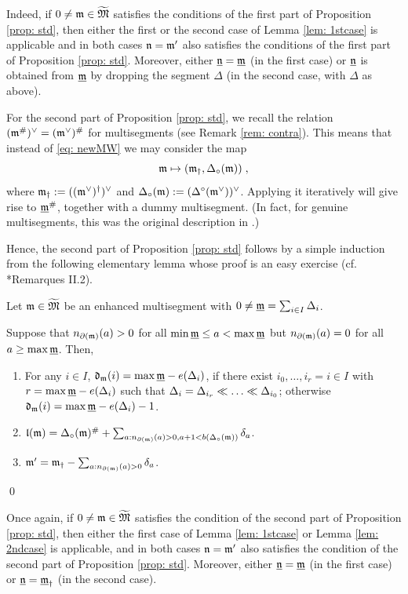 \documentclass{ert-l} %
\begin{document}
Indeed, if $0\ne\mathfrak{m} \in \widetilde{\mathfrak{M}}$ satisfies the conditions of the first part of
Proposition \ref{prop: std}, then either the first or the second case of Lemma \ref{lem: 1stcase} is applicable and
in both cases $\mathfrak{n} = \mathfrak{m}'$ also satisfies the conditions of the first part of Proposition \ref{prop: std}. Moreover, either $\underline{\mathfrak{n}}=\underline{\mathfrak{m}}$
(in the first case) or $\underline{\mathfrak{n}}$ is obtained from $\underline{\mathfrak{m}}$ by dropping the segment $\Delta$ (in the second case,
with $\Delta$ as above).


For the second part of Proposition \ref{prop: std}, we recall the relation $(\mathfrak{m}^\#)^\vee=(\mathfrak{m}^\vee)^\#$ for multisegments (see Remark \ref{rem: contra}).
This means that instead of \eqref{eq: newMW} we may consider the map
\[
\mathfrak{m}\mapsto(\mathfrak{m}_{\dagger}, \Delta_{\circ}(\mathfrak{m}))\;,
\]
where $\mathfrak{m}_{\dagger}: = ((\mathfrak{m}^\vee)^{\dagger})^\vee$ and $\Delta_{\circ}(\mathfrak{m}): =(\Delta^{\circ}(\mathfrak{m}^\vee))^\vee$.
Applying it iteratively will give rise to $\underline{\mathfrak{m}}^\#$, together with a dummy multisegment.
(In fact, for genuine multisegments, this was the original description in \cite{MR863522}.)

Hence, the second part of Proposition \ref{prop: std} follows by a simple induction from the following
elementary lemma whose proof is an easy exercise (cf. \cite{MR863522}*{Remarques II.2}).


\begin{lemma} \label{lem: 2ndcase}
Let $\mathfrak{m} \in \widetilde{\mathfrak{M}}$ be an enhanced multisegment with $0\neq \underline{\mathfrak{m}}=\sum_{i\in I}\Delta_i$.

Suppose that $n_{\partial(\mathfrak{m})}(a)>0$ for all $\min\underline{\mathfrak{m}}\le a<\max\underline{\mathfrak{m}}$ but $n_{\partial(\mathfrak{m})}(a)=0$ for all $a\ge\max\underline{\mathfrak{m}}$. Then,
\begin{enumerate}
\item For any $i\in I$, $\mathfrak{d}_{\mathfrak{m}}(i)=\max\underline{\mathfrak{m}}-e(\Delta_i)$, if there exist $i_0,\dots,i_r=i\in I$
with $r=\max\underline{\mathfrak{m}}-e(\Delta_i)$ such that $\Delta_i=\Delta_{i_r}\smlr\dots\smlr\Delta_{i_0}$;
otherwise $\mathfrak{d}_{\mathfrak{m}}(i)=\max\underline{\mathfrak{m}}-e(\Delta_i)-1$.
\item $\mathfrak{l}(\mathfrak{m}) = \Delta_{\circ}(\mathfrak{m})^\#+\sum_{a:n_{\partial(\mathfrak{m})}(a)>0,a+1<b(\Delta_{\circ}(\mathfrak{m}))}\delta_a$.
\item $\mathfrak{m}'=\mathfrak{m}_{\dagger}-\sum_{a:n_{\partial(\mathfrak{m})}(a)>0}\delta_a$.
\end{enumerate}
\qed
\end{lemma}


Once again, if $0\ne\mathfrak{m} \in \widetilde{\mathfrak{M}}$ satisfies the condition of the second part of
Proposition \ref{prop: std}, then either the first case of Lemma \ref{lem: 1stcase} or Lemma \ref{lem: 2ndcase} is applicable, and
in both cases $\mathfrak{n}=\mathfrak{m}'$ also satisfies the condition of the second part of Proposition \ref{prop: std}. Moreover, either $\underline{\mathfrak{n}}=\underline{\mathfrak{m}}$
(in the first case) or $\underline{\mathfrak{n}}={\underline{\mathfrak{m}}}_{\dagger}$ (in the second case).
\end{document}
